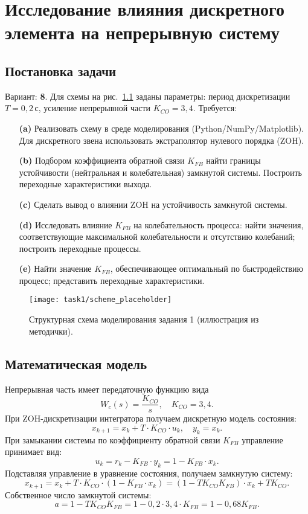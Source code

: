 
\chapter{Исследование влияния дискретного элемента на непрерывную систему}
\section{Постановка задачи}
Вариант: \textbf{8}. Для схемы на рис.~\ref{fig:task1_scheme} заданы параметры: период дискретизации \(T=0{,}2\,\text{с}\), усиление непрерывной части \(K_{CO}=3{,}4\). Требуется:
\begin{enumerate}
  \item[\textbf{(a)}] Реализовать схему в среде моделирования (Python/NumPy/Matplotlib). Для дискретного звена использовать экстраполятор нулевого порядка (ZOH).
  \item[\textbf{(b)}] Подбором коэффициента обратной связи \(K_{FB}\) найти границы устойчивости (нейтральная и колебательная) замкнутой системы. Построить переходные характеристики выхода.
  \item[\textbf{(c)}] Сделать вывод о влиянии ZOH на устойчивость замкнутой системы.
  \item[\textbf{(d)}] Исследовать влияние \(K_{FB}\) на колебательность процесса: найти значения, соответствующие максимальной колебательности и отсутствию колебаний; построить переходные процессы.
  \item[\textbf{(e)}] Найти значение \(K_{FB}\), обеспечивающее оптимальный по быстродействию процесс; представить переходные характеристики.
\end{enumerate}

\begin{figure}[H]
  \centering
  \texttt{[image: task1/scheme\_placeholder]}
  \caption{Структурная схема моделирования задания 1 (иллюстрация из методички).}
  \label{fig:task1_scheme}
\end{figure}

\section{Математическая модель}
Непрерывная часть имеет передаточную функцию вида
\[
  W_c(s) = \frac{K_{CO}}{s}, \quad K_{CO}=3{,}4.
\]
При ZOH-дискретизации интегратора получаем дискретную модель состояния:
\[
  x_{k+1} = x_k + T \cdot K_{CO} \cdot u_k, \quad y_k = x_k.
\]
При замыкании системы по коэффициенту обратной связи \(K_{FB}\) управление принимает вид:
\[
  u_k = r_k - K_{FB} \cdot y_k = 1 - K_{FB} \cdot x_k.
\]
Подставляя управление в уравнение состояния, получаем замкнутую систему:
\[
  x_{k+1} = x_k + T \cdot K_{CO} \cdot (1 - K_{FB} \cdot x_k) = (1 - T K_{CO} K_{FB}) \cdot x_k + T K_{CO}.
\]
Собственное число замкнутой системы:
\[
  a = 1 - T K_{CO} K_{FB} = 1 - 0{,}2 \cdot 3{,}4 \cdot K_{FB} = 1 - 0{,}68 K_{FB}.
\]

